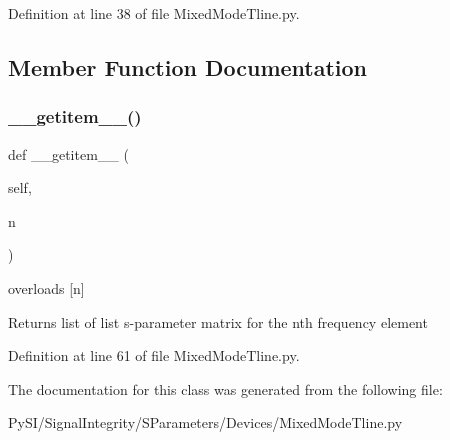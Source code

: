 Definition at line 38 of file Mixed\+Mode\+Tline.\+py.



\subsection{Member Function Documentation}
\mbox{\label{classSignalIntegrity_1_1SParameters_1_1Devices_1_1MixedModeTline_1_1MixedModeTLine_ab7a6da5139e0878b590d68292aaa70f2}} 
\subsubsection{\texorpdfstring{\+\_\+\+\_\+getitem\+\_\+\+\_\+()}{\_\_getitem\_\_()}}
{\footnotesize\ttfamily def \+\_\+\+\_\+getitem\+\_\+\+\_\+ (\begin{DoxyParamCaption}\item[{}]{self,  }\item[{}]{n }\end{DoxyParamCaption})}



overloads \mbox{[}n\mbox{]} 

\begin{DoxyReturn}{Returns}
list of list s-\/parameter matrix for the nth frequency element 
\end{DoxyReturn}


Definition at line 61 of file Mixed\+Mode\+Tline.\+py.



The documentation for this class was generated from the following file\+:\begin{DoxyCompactItemize}
\item 
Py\+S\+I/\+Signal\+Integrity/\+S\+Parameters/\+Devices/Mixed\+Mode\+Tline.\+py\end{DoxyCompactItemize}
